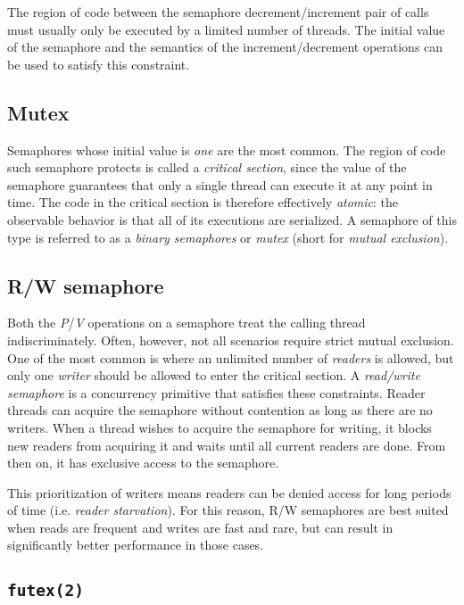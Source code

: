 The region of code between the semaphore decrement/increment pair of calls must
usually only be executed by a limited number of threads.  The initial value of
the semaphore and the semantics of the increment/decrement operations can be
used to satisfy this constraint.

\subsection{Mutex}

\label{subsec:conc:mutex}

Semaphores whose initial value is \emph{one} are the most common.  The region of
code such semaphore protects is called a \textit{critical section}, since the
value of the semaphore guarantees that only a single thread can execute it at
any point in time.  The code in the critical section is therefore effectively
\emph{atomic}: the observable behavior is that all of its executions are
serialized.  A semaphore of this type is referred to as a \textit{binary
semaphores} or \textit{mutex} (short for \textit{mutual exclusion}).

\subsection{R/W semaphore}

Both the \textit{P}/\textit{V} operations on a semaphore treat the calling
thread indiscriminately.  Often, however, not all scenarios require strict
mutual exclusion.  One of the most common is where an unlimited number of
\emph{readers} is allowed, but only one \emph{writer} should be allowed to enter
the critical section.  A \textit{read/write semaphore} is a concurrency
primitive that satisfies these constraints.  Reader threads can acquire the
semaphore without contention as long as there are no writers.  When a thread
wishes to acquire the semaphore for writing, it blocks new readers from
acquiring it and waits until all current readers are done.  From then on, it has
exclusive access to the semaphore.

This prioritization of writers means readers can be denied access for long
periods of time (i.e. \textit{reader starvation}).  For this reason, R/W
semaphores are best suited when reads are frequent and writes are fast and rare,
but can result in significantly better performance in those cases.

\subsection{\texttt{futex(2)}}

